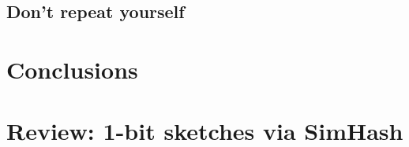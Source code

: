 \documentclass{llncs}
\begin{document}
\subsection{Don't repeat yourself}

\section{Conclusions}




\appendix

\section{Review: 1-bit sketches via SimHash}
\label{app:sketches}
\end{document}
